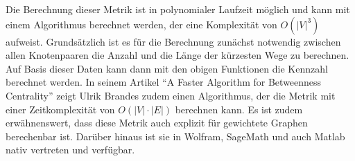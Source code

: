 \documentclass[a4paper,12pt,ngerman,chapterprefix=false,listof=totoc,bibliography=totoc]{scrreprt}
\begin{document}
{Die Berechnung dieser Metrik ist in polynomialer Laufzeit möglich und kann mit einem Algorithmus berechnet werden, der eine Komplexität von \(O(|V|^3)\) aufweist. Grundsätzlich ist es für die Berechnung zunächst notwendig zwischen allen Knotenpaaren die Anzahl und die Länge der kürzesten Wege zu berechnen. Auf Basis dieser Daten kann dann mit den obigen Funktionen die Kennzahl berechnet werden. In seinem Artikel "`A Faster Algorithm for Betweenness Centrality"' zeigt Ulrik Brandes zudem einen Algorithmus, der die Metrik mit einer Zeitkomplexität von \(O(|V|\cdot |E|)\) berechnen kann. Es ist zudem erwähnenswert, dass diese Metrik auch explizit für gewichtete Graphen berechenbar ist. \cite{brandes_faster_2001} Darüber hinaus ist sie in Wolfram, SageMath und auch Matlab nativ vertreten und verfügbar. \cite{wolfram_graph_2020,sagemath_generic_nodate,matlab_measure_2020}
}
\end{document}
